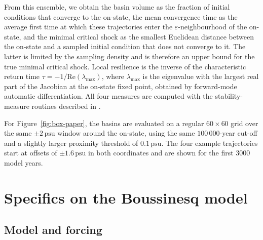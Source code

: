 \documentclass[12pt, a4paper]{article}
\newcommand{\psu}{\,\text{psu}}
\begin{document}
From this ensemble, we obtain the basin volume as the fraction of initial conditions that converge to the on-state, the mean convergence time as the average first time at which these trajectories enter the $\varepsilon$-neighbourhood of the on-state, and the minimal critical shock as the smallest Euclidean distance between the on-state and a sampled initial condition that does not converge to it. The latter is limited by the sampling density and is therefore an upper bound for the true minimal critical shock. Local resilience is the inverse of the characteristic return time $\tau=-1/\mathrm{Re}(\lambda_{\max})$, where $\lambda_{\max}$ is the eigenvalue with the largest real part of the Jacobian at the on-state fixed point, obtained by forward-mode automatic differentiation. All four measures are computed with the stability-measure routines described in \citet{Morr2026ComputingResilienceMeasures}.

For Figure~\ref{fig:box-paper}, the basins are evaluated on a regular $60\times60$ grid over the same $\pm2\psu{}$ window around the on-state, using the same $100\,000$-year cut-off and a slightly larger proximity threshold of $0.1\psu{}$. The four example trajectories start at offsets of $\pm1.6\psu{}$ in both coordinates and are shown for the first 3000 model years.

\section{Specifics on the Boussinesq model}
\label{app:boussinesq}

\subsection*{Model and forcing}
\end{document}
